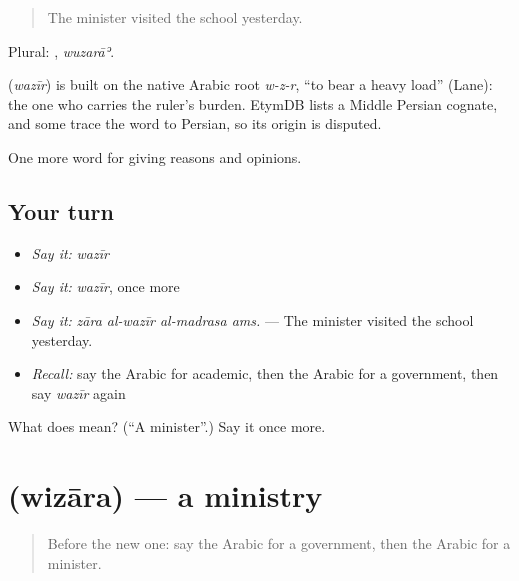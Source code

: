 \begin{quote}
The minister visited the school yesterday.
\end{quote}

Plural: , \emph{wuzarāʾ}.

\begin{cousinweb}
\textbf{} (\emph{wazīr}) is built on the native Arabic root \emph{w-z-r}, \textquotedblleft{}to bear a heavy load\textquotedblright{} (Lane): the one who carries the ruler's burden. EtymDB lists a Middle Persian cognate, and some trace the word to Persian, so its origin is disputed.
\end{cousinweb}

\begin{grammarlens}[title={What you've built}]
One more word for giving reasons and opinions.
\end{grammarlens}

\subsection*{Your turn}
\begin{itemize}
\raggedright
  \item \emph{Say it:} \emph{wazīr}
  \item \emph{Say it:} \emph{wazīr}, once more
  \item \emph{Say it:} \emph{zāra al-wazīr al-madrasa ams.} — The minister visited the school yesterday.
  \item \emph{Recall:} say the Arabic for academic, then the Arabic for a government, then say \emph{wazīr} again
\end{itemize}

\begin{tcolorbox}[breakable,colback=teal!4,colframe=teal!35!black,title={Before you move on}]
What does  mean? (\textquotedblleft{}A minister\textquotedblright{}.) Say it once more.
\end{tcolorbox}
\section[\texorpdfstring{\ar{وزارة} (wizāra)}{وزارة (wizāra)}]{ (wizāra) — a ministry}

\label{lesson:AR-C377-wizara}



\begin{quote}
Before the new one: say the Arabic for a government, then the Arabic for a minister.
\end{quote}


